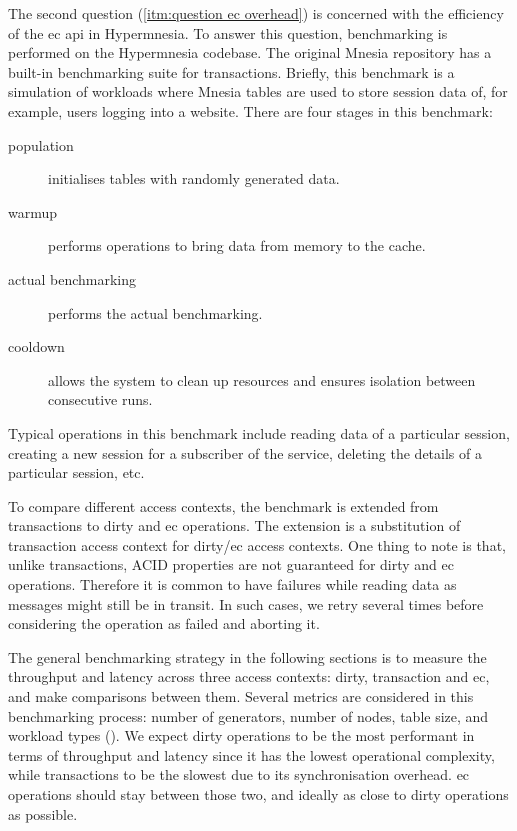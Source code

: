 The second question (\cref{itm:question ec overhead}) 
is concerned with the efficiency of the \acrlong{ec} \acrshort{api} in Hypermnesia. 
To answer this question, benchmarking is performed on the Hypermnesia codebase.
The original Mnesia repository has a built-in benchmarking suite for transactions. 
Briefly, this benchmark is a
simulation of workloads where Mnesia tables are used to store session data of,
for example, users logging into a website. There are four stages in this benchmark:

\begin{description}
  \item[population] initialises tables with randomly generated data.
  \item[warmup] performs operations to bring data from memory to the cache.
  \item[actual benchmarking] performs the actual benchmarking.
  \item[cooldown] allows the system to clean up resources and ensures isolation
  between consecutive runs.
\end{description}

Typical operations in this benchmark include reading
data of a particular session, creating a new session for a subscriber of
the service, deleting the details of a particular session, etc.

To compare different access contexts, the benchmark is extended from transactions 
to dirty and \acrshort{ec} operations. The extension is a substitution of transaction
access context for dirty/\acrshort{ec} access contexts. One thing to note is that,
unlike transactions, ACID properties are not guaranteed for dirty and \acrshort{ec}
operations. Therefore it is common
to have failures while reading data as messages might still be in transit. 
In such cases, we retry several times before considering the operation
as failed and aborting it.

The general benchmarking strategy in the following sections is to measure 
the throughput and latency across three access contexts: dirty, transaction 
and \acrshort{ec}, and make comparisons between them. Several metrics are 
considered in this benchmarking process: number of generators, 
number of nodes, table size, and workload types 
().
We expect dirty operations to be the most performant in terms of throughput and 
latency since it has the lowest 
operational complexity, while transactions to be the slowest
due to its synchronisation overhead. \acrshort{ec} operations should stay
between those two, and ideally as close to dirty operations as possible.

